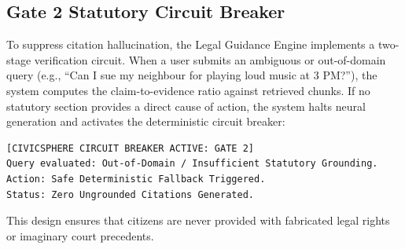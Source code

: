 \subsection{Gate 2 Statutory Circuit Breaker}
To suppress citation hallucination, the Legal Guidance Engine implements a two-stage verification circuit. When a user submits an ambiguous or out-of-domain query (e.g., ``Can I sue my neighbour for playing loud music at 3 PM?''), the system computes the claim-to-evidence ratio against retrieved chunks. If no statutory section provides a direct cause of action, the system halts neural generation and activates the deterministic circuit breaker:
\begin{verbatim}
[CIVICSPHERE CIRCUIT BREAKER ACTIVE: GATE 2]
Query evaluated: Out-of-Domain / Insufficient Statutory Grounding.
Action: Safe Deterministic Fallback Triggered.
Status: Zero Ungrounded Citations Generated.
\end{verbatim}
This design ensures that citizens are never provided with fabricated legal rights or imaginary court precedents.

